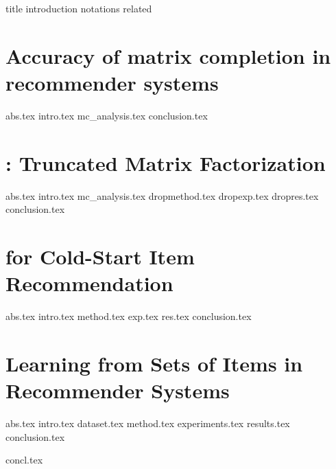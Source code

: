 \documentclass[11pt,oneside]{mnthesis}
\begin{document}
  
  
  
 
    {title}
    {introduction}
    {notations}
    {related}
    
    \chapter {Accuracy of matrix completion in recommender systems}  \label{ch:matcomp}
    {abs.tex}
    {intro.tex}
    {mc_analysis.tex}
    {conclusion.tex}
    
    
    \chapter{\TMF: Truncated Matrix Factorization} \label{ch:tmf}
    {abs.tex}
    {intro.tex}
    {mc_analysis.tex}
    {dropmethod.tex}
    {dropexp.tex}
    {dropres.tex}
    {conclusion.tex}

      
    \chapter {\CFEXP for Cold-Start \TOPN Item Recommendation} \label{ch:bilinear}
    {abs.tex}
    {intro.tex}
    {method.tex}
    {exp.tex}
    {res.tex}
    {conclusion.tex}
    
    
    
    \chapter{Learning from Sets of Items in Recommender Systems} \label{ch:lfs}
    {abs.tex}
    {intro.tex}
    {dataset.tex}
    {method.tex}
    {experiments.tex}
    {results.tex}
    {conclusion.tex}


    {concl.tex}


  
  
\end{document}
